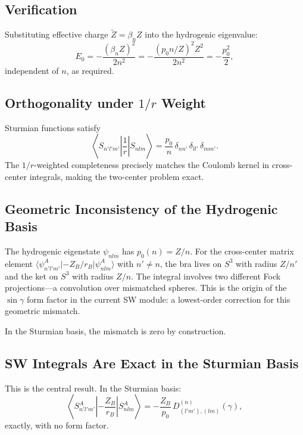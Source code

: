 \documentclass[aps,pra,twocolumn,superscriptaddress,longbibliography]{revtex4-2}
\begin{document}
\subsection{Verification}

Substituting effective charge $\tilde{Z} = \beta_n Z$ into the
hydrogenic eigenvalue:
\begin{equation}
E_0 = -\frac{(\beta_n Z)^2}{2n^2}
     = -\frac{(p_0 n / Z)^2 Z^2}{2n^2}
     = -\frac{p_0^2}{2},
\label{eq:sturmian_verify}
\end{equation}
independent of $n$, as required.

\subsection{Orthogonality under $1/r$ Weight}

Sturmian functions satisfy
\begin{equation}
\left\langle S_{n'l'm'}\left|\frac{1}{r}\right| S_{nlm}\right\rangle
  = \frac{p_0}{n}\,\delta_{nn'}\,\delta_{ll'}\,\delta_{mm'}.
\label{eq:sturmian_orthog}
\end{equation}
The $1/r$-weighted completeness precisely matches the Coulomb kernel
in cross-center integrals, making the two-center problem exact.

\subsection{Geometric Inconsistency of the Hydrogenic Basis}

The hydrogenic eigenstate $\psi_{nlm}$ has $p_0(n) = Z/n$.  For
the cross-center matrix element
$\langle \psi^A_{n'l'm'} | {-Z_B/r_B} | \psi^A_{nlm} \rangle$
with $n' \neq n$, the bra lives on $S^3$ with radius $Z/n'$ and the
ket on $S^3$ with radius $Z/n$.  The integral involves two different
Fock projections---a convolution over mismatched spheres.  This is
the origin of the $\sin\gamma$ form factor in the current SW module:
a lowest-order correction for this geometric mismatch.

In the Sturmian basis, the mismatch is zero by construction.

\subsection{SW Integrals Are Exact in the Sturmian Basis}

This is the central result.  In the Sturmian basis:
\begin{equation}
\boxed{
\left\langle S^A_{n'l'm'}\left| -\frac{Z_B}{r_B}\right|
S^A_{nlm}\right\rangle
= -\frac{Z_B}{p_0}\, D^{(n)}_{(l'm'),(lm)}(\gamma),
}
\label{eq:sw_exact}
\end{equation}
exactly, with no form factor.
\end{document}
